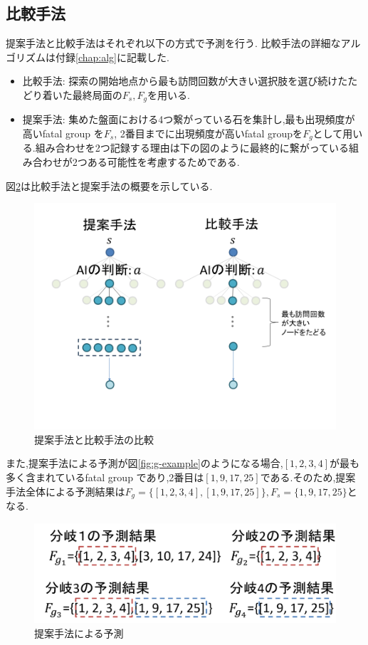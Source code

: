 \subsection{比較手法}
提案手法と比較手法はそれぞれ以下の方式で予測を行う.
比較手法の詳細なアルゴリズムは付録\ref{chap:alg}に記載した.
\newpage
\begin{itemize}
	\item 比較手法: 探索の開始地点から最も訪問回数が大きい選択肢を選び続けたたどり着いた最終局面の$F_s, F_g$を用いる.
	\item 提案手法: 集めた盤面における4つ繋がっている石を集計し,最も出現頻度が高いfatal group を$F_s$, 2番目までに出現頻度が高いfatal groupを$F_g$として用いる.組み合わせを2つ記録する理由は下の図のように最終的に繋がっている組み合わせが2つある可能性を考慮するためである.
\end{itemize}
図\ref{fig:compare}は比較手法と提案手法の概要を示している.
\begin{figure}[t]
	\centering
	\includegraphics[width=\linewidth]{./figure/compare-image.png}
	\caption{提案手法と比較手法の比較}
	\label{fig:compare}
\end{figure}
また,提案手法による予測が図\ref{fig:g-example}のようになる場合,$[1,2,3,4]$が最も多く含まれているfatal group
であり,2番目は$[1, 9, 17, 25]$である.そのため,提案手法全体による予測結果は$F_g=\{[1, 2, 3, 4], [1, 9, 17, 25]\}, F_s=\{1, 9, 17, 25\}$となる.
\begin{figure}[t]
	\centering
	\includegraphics[width=\linewidth]{./figure/g-example.png}
	\caption{提案手法による予測}
	\label{fig:compare}
\end{figure}

